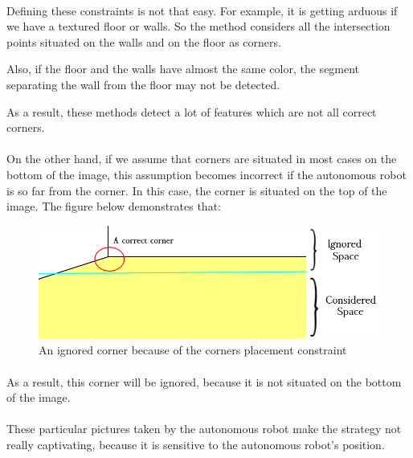 \documentclass[12pt]{report}
\begin{document}
	 \paragraph{}
	 Defining these constraints is not that easy. For example, it is getting arduous if we have a textured floor or walls. So the method considers all the intersection points situated on the walls and on the floor as corners. 
	
	 Also, if the floor and the walls have almost the same color, the segment separating the wall from the floor may not be detected.
	 
	 As a result, these methods detect a lot of features which are not all correct corners.
	 
	 \paragraph{}
	 On the other hand, if we assume that corners are situated in most cases on the bottom of the image, this assumption becomes incorrect if the autonomous robot is so far from the corner. In this case, the corner is situated on the top of the image. The figure below demonstrates that:
	 	\begin{figure}[H]
	 	\begin{center}
	 		\includegraphics[scale=0.6]{res/start1_c1.png}
	 		\caption{An ignored corner because of the corners placement constraint}
	 	\end{center}
	 \end{figure}
	 \paragraph{}
	 As a result, this corner will be ignored, because it is not situated on the bottom of the image.
	 
	 \paragraph{}
	 These particular pictures taken by the autonomous robot make the strategy not really captivating, because it is sensitive to the autonomous robot's position.
	 
\end{document}

